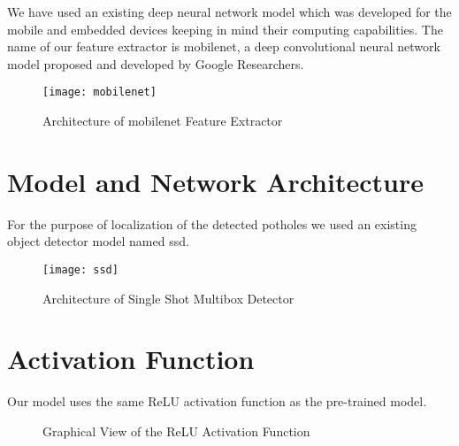         We have used an existing deep neural network model which was developed for the mobile and embedded devices keeping in mind their computing capabilities. The name of our feature extractor is \gls{mobilenet}\cite{howard2017mobilenets}, a deep convolutional neural network model proposed and developed by Google Researchers\cite{howard2017mobilenets}.
        
        \begin{figure}[h]
            \centering
            \texttt{[image: mobilenet]}
            \caption{Architecture of \gls{mobilenet} Feature Extractor}
            \label{fig:mobilenet_arch}
        \end{figure}
        
    \section{Model and Network Architecture}
        For the purpose of localization of the detected potholes we used an existing object detector model named \acrfull{ssd}\cite{liu2016ssd}.
                
        \begin{figure}[h]
            \centering
            \texttt{[image: ssd]}
            \caption{Architecture of Single Shot Multibox Detector}
            \label{fig:ssd_arch}
        \end{figure}
        
    \section{Activation Function}
        Our model uses the same ReLU activation function as the pre-trained model.
        \begin{figure}[h]
            \centering
            \caption{Graphical View of the ReLU Activation Function}
            \label{fig:relu}
        \end{figure}
            
